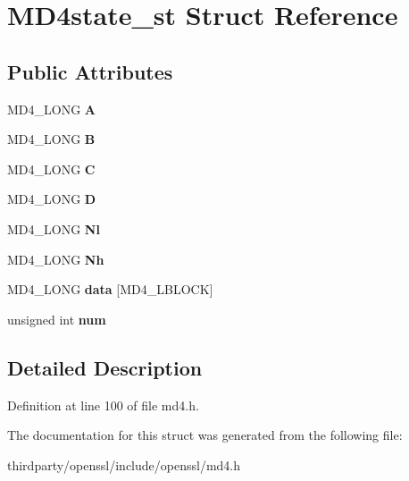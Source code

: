 \hypertarget{struct_m_d4state__st}{}\section{M\+D4state\+\_\+st Struct Reference}
\label{struct_m_d4state__st}
\subsection*{Public Attributes}
\begin{DoxyCompactItemize}
\item 
\mbox{\label{struct_m_d4state__st_a9573434688a6578764e83cf2c3ea5d20}} 
M\+D4\+\_\+\+L\+O\+NG {\bfseries A}
\item 
\mbox{\label{struct_m_d4state__st_aa04cb7f782726f8ab6d9e78fc4b93f63}} 
M\+D4\+\_\+\+L\+O\+NG {\bfseries B}
\item 
\mbox{\label{struct_m_d4state__st_a9397abcee77c8bdfdbb2d47fc448e486}} 
M\+D4\+\_\+\+L\+O\+NG {\bfseries C}
\item 
\mbox{\label{struct_m_d4state__st_ac918583b54dc234e97953a32ac0ae97f}} 
M\+D4\+\_\+\+L\+O\+NG {\bfseries D}
\item 
\mbox{\label{struct_m_d4state__st_a7f97311bae9341a6566991805a529f38}} 
M\+D4\+\_\+\+L\+O\+NG {\bfseries Nl}
\item 
\mbox{\label{struct_m_d4state__st_a8a0b1c520fc5b0eaeb310263694a46f8}} 
M\+D4\+\_\+\+L\+O\+NG {\bfseries Nh}
\item 
\mbox{\label{struct_m_d4state__st_a7d723771095f8b3e5404cc5833603551}} 
M\+D4\+\_\+\+L\+O\+NG {\bfseries data} \mbox{[}M\+D4\+\_\+\+L\+B\+L\+O\+CK\mbox{]}
\item 
\mbox{\label{struct_m_d4state__st_ae7e35fdee3a693c34c4322b00e9a9541}} 
unsigned int {\bfseries num}
\end{DoxyCompactItemize}


\subsection{Detailed Description}


Definition at line 100 of file md4.\+h.



The documentation for this struct was generated from the following file\+:\begin{DoxyCompactItemize}
\item 
thirdparty/openssl/include/openssl/md4.\+h\end{DoxyCompactItemize}
